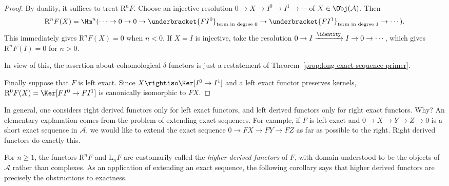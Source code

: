 \begin{proof}
	By duality, it suffices to treat $\mathrm{R}^nF$. Choose an injective
	resolution $0\to X\to I^0\to I^1\to\cdots$ of
	$X\in\Obj(\mathcal{A})$. Then
	\[ \mathrm{R}^n F(X) = \Hm^n ( \cdots \to 0 \to 0 \to \underbracket{FI^0}_{\text{term in degree $0$}} \to \underbracket{FI^1}_{\text{term in degree $1$}} \to \cdots ). \]
	This immediately gives $\mathrm{R}^nF(X)=0$ when $n<0$. If $X=I$ is
	injective, take the resolution $0\to I\xrightarrow{\identity}I\to0\to
	\cdots$, which gives $\mathrm{R}^nF(I)=0$ for $n>0$.

	In view of this, the assertion about cohomological $\delta$-functors is
	just a restatement of Theorem~\ref{prop:long-exact-sequence-primer}.

	Finally suppose that $F$ is left exact. Since
	$X\rightiso\Ker[I^0\to I^1]$ and a left exact functor preserves kernels,
	$\mathrm{R}^0F(X)=\Ker[FI^0\to FI^1]$ is canonically isomorphic to $FX$.
\end{proof}

In general, one considers right derived functors only for left exact functors,
and left derived functors only for right exact functors. Why? An elementary
explanation comes from the problem of extending exact sequences. For example,
if $F$ is left exact and $0\to X\to Y\to Z\to0$ is a short exact sequence in
$\mathcal{A}$, we would like to extend the exact sequence
$0\to FX\to FY\to FZ$ as far as possible to the right. Right derived
functors do exactly this.

For $n\geq1$, the functors $\mathrm{R}^nF$ and $\mathrm{L}_nF$ are
customarily called the \emph{higher derived functors} of $F$, with domain
understood to be the objects of $\mathcal{A}$ rather than complexes. As an
application of extending an exact sequence, the following corollary says that
higher derived functors are precisely the obstructions to exactness.

